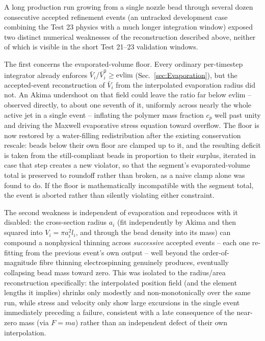 A long production run growing from a single nozzle bead through several
dozen consecutive accepted refinement events (an untracked development case
combining the Test 23 physics with a much longer integration window) exposed
two distinct numerical weaknesses of the reconstruction described above,
neither of which is visible in the short Test 21--23 validation windows.

The first concerns the evaporated-volume floor. Every ordinary per-timestep
integrator already enforces $\bar V_{i}/\bar V_{i}^{0}\geq\text{evlim}$
(Sec.~\ref{sec:Evaporation}), but the accepted-event reconstruction of
$\bar V_{i}$ from the interpolated evaporation radius did not. An Akima
undershoot on that field could leave the ratio far below evlim -- observed
directly, to about one seventh of it, uniformly across nearly the whole
active jet in a single event -- inflating the polymer mass fraction $c_{p}$
well past unity and driving the Maxwell evaporative stress equation toward
overflow. The floor is now restored by a water-filling redistribution after
the existing conservation rescale: beads below their own floor are clamped
up to it, and the resulting deficit is taken from the still-compliant beads
in proportion to their surplus, iterated in case that step creates a new
violator, so that the segment's evaporated-volume total is preserved to
roundoff rather than broken, as a naive clamp alone was found to do. If the
floor is mathematically incompatible with the segment total, the event is
aborted rather than silently violating either constraint.

The second weakness is independent of evaporation and reproduces with it
disabled: the cross-section radius $a_{i}$ (fit independently by Akima and
then squared into $V_{i}=\pi a_{i}^{2}l_{i}$, and through the bead density
into its mass) can compound a nonphysical thinning across \emph{successive}
accepted events -- each one re-fitting from the previous event's own
output -- well beyond the order-of-magnitude fibre thinning electrospinning
genuinely produces, eventually collapsing bead mass toward zero. This was
isolated to the radius/area reconstruction specifically: the interpolated
position field (and the element lengths it implies) shrinks only modestly
and non-monotonically over the same run, while stress and velocity only
show large excursions in the single event immediately preceding a failure,
consistent with a late consequence of the near-zero mass (via $F=ma$) rather
than an independent defect of their own interpolation.

